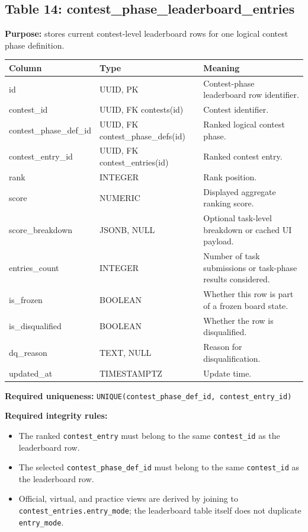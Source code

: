 \documentclass[11pt,a4paper]{article}
\begin{document}
\subsection{Table 14: contest\_phase\_leaderboard\_entries}
\textbf{Purpose:} stores current contest-level leaderboard rows for one logical contest phase definition.

\begin{longtable}{>{\raggedright\arraybackslash}p{} >{\raggedright\arraybackslash}p{} >{\raggedright\arraybackslash}p{}}
\toprule
\textbf{Column} & \textbf{Type} & \textbf{Meaning} \\
\midrule
id & UUID, PK & Contest-phase leaderboard row identifier. \\
contest\_id & UUID, FK contests(id) & Contest identifier. \\
contest\_phase\_def\_id & UUID, FK contest\_phase\_defs(id) & Ranked logical contest phase. \\
contest\_entry\_id & UUID, FK contest\_entries(id) & Ranked contest entry. \\
rank & INTEGER & Rank position. \\
score & NUMERIC & Displayed aggregate ranking score. \\
score\_breakdown & JSONB, NULL & Optional task-level breakdown or cached UI payload. \\
entries\_count & INTEGER & Number of task submissions or task-phase results considered. \\
is\_frozen & BOOLEAN & Whether this row is part of a frozen board state. \\
is\_disqualified & BOOLEAN & Whether the row is disqualified. \\
dq\_reason & TEXT, NULL & Reason for disqualification. \\
updated\_at & TIMESTAMPTZ & Update time. \\
\bottomrule
\end{longtable}

\textbf{Required uniqueness:} \texttt{UNIQUE(contest\_phase\_def\_id, contest\_entry\_id)}

\textbf{Required integrity rules:}
\begin{itemize}
    \item The ranked \texttt{contest\_entry} must belong to the same \texttt{contest\_id} as the leaderboard row.
    \item The selected \texttt{contest\_phase\_def\_id} must belong to the same \texttt{contest\_id} as the leaderboard row.
    \item Official, virtual, and practice views are derived by joining to \texttt{contest\_entries.entry\_mode}; the leaderboard table itself does not duplicate \texttt{entry\_mode}.
\end{itemize}
\end{document}
